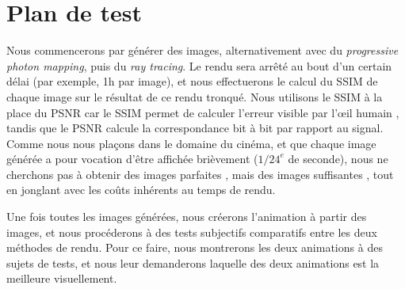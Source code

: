 \documentclass[a4paper]{article}
\begin{document}
\section{Plan de test}
Nous commencerons par générer des images, alternativement avec du \emph{progressive photon mapping}, puis du \emph{ray tracing}. Le rendu sera arrêté au bout d'un certain délai (par exemple, 1h par image), et nous effectuerons le calcul du SSIM de chaque image sur le résultat de ce rendu tronqué. Nous utilisons le SSIM à la place du PSNR car le SSIM permet de calculer l'erreur \og visible par l'\oe il humain \fg, tandis que le PSNR calcule la correspondance bit à bit par rapport au signal. Comme nous nous plaçons dans le domaine du cinéma, et que chaque image générée a pour vocation d'être affichée brièvement (${1/24}^e$ de seconde), nous ne cherchons pas à obtenir des images \og parfaites \fg, mais des images \og suffisantes \fg, tout en jonglant avec les coûts inhérents au temps de rendu.

Une fois toutes les images générées, nous créerons l'animation à partir des images, et nous procéderons à des tests subjectifs comparatifs entre les deux méthodes de rendu. Pour ce faire, nous montrerons les deux animations à des sujets de tests, et nous leur demanderons laquelle des deux animations est la meilleure visuellement.
\end{document}
